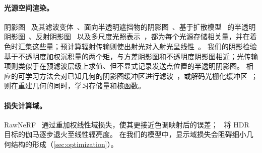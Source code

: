 \paragraph{光源空间渲染。}
阴影图~\cite{williams1978casting} 及其滤波变体~\cite{reeves1987rendering,fernando2005percentage,donnelly2006variance,annen2007convolution,annen2008exponential,peters2015moment}、面向半透明遮挡物的阴影图~\cite{lokovic2000deep,kim2001opacity,yuksel2008deep,jansen2010fourier,salvi2010adaptive,peters2016beyond}、基于扩散模型~\cite{jensen2001practical,deon2007efficient} 的半透明阴影图~\cite{dachsbacher2003translucent,jimenez2010real}、反射阴影图~\cite{dachsbacher2005reflective,dachsbacher2006splatting} 以及多尺度光照表示~\cite{kaplanyan2010cascaded,crassin2011interactive}，都为每个光源存储相关量，并在着色时汇集这些量；预计算辐射传输则使出射光对入射光呈线性~\cite{sloan2002precomputed}。
我们的阴影检验基于不透明度加权沉积量的两个矩，与方差阴影图和不透明度阴影图相近；光传输项则类似于在预滤波层级上求值、但不显式记录发送点位置的半透明阴影图。
相应的可学习方法会对已知几何的阴影图缓冲区进行滤波~\cite{datta2022neural}，或解码光栅化缓冲区~\cite{nalbach2017deep,thies2019deferred,gao2020deferred,zhang2021neural,ye2024deferred}；\ours 则在重建几何的同时，学习存储量和核函数。

\paragraph{损失计算域。}
RawNeRF~\cite{mildenhall2022nerf} 通过重加权线性域损失，使其更接近色调映射后的误差；\gsthree~\cite{bi2024gs3} 将 HDR 目标的伽马逐步退火至线性辐亮度。
在我们的模型中，显示域损失会阻碍细小几何结构的形成（\cref{sec:optimization}）。
